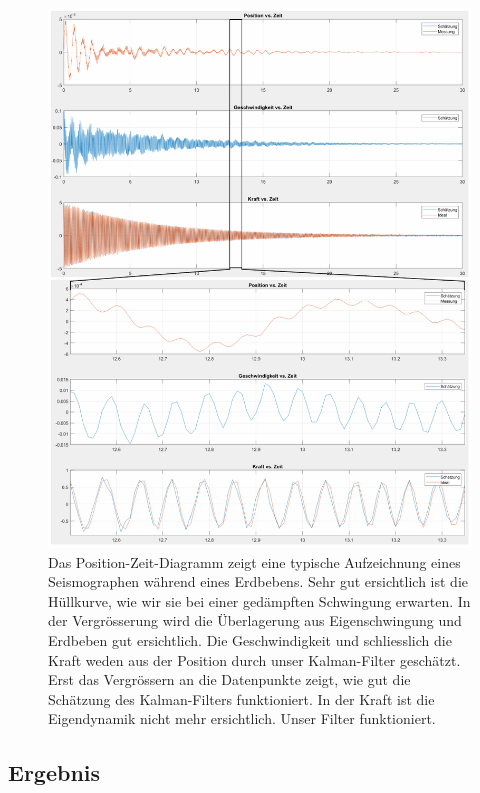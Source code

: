 \begin{figure}
  \begin{center}
    \includegraphics[width=.95\linewidth,keepaspectratio]{papers/erdbeben/images/standard.PDF}
    \caption{
      Das Position-Zeit-Diagramm zeigt eine typische Aufzeichnung eines Seismographen während eines Erdbebens.
      Sehr gut ersichtlich ist die Hüllkurve, wie wir sie bei einer gedämpften Schwingung erwarten.
      In der Vergrösserung wird die Überlagerung aus Eigenschwingung und Erdbeben gut ersichtlich.
      Die Geschwindigkeit und schliesslich die Kraft weden aus der Position durch unser Kalman-Filter geschätzt.
      Erst das Vergrössern an die Datenpunkte zeigt, wie gut die Schätzung des Kalman-Filters funktioniert.
      In der Kraft ist die Eigendynamik nicht mehr ersichtlich. Unser Filter funktioniert.
      }
    \label{erdbeben:fig:standard-alles}
  \end{center}
\end{figure}

\subsection*{Ergebnis}

